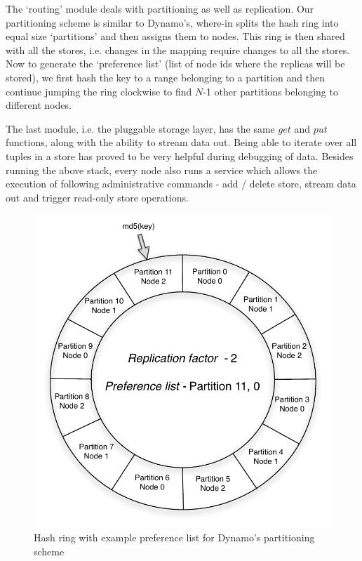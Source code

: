 The `routing' module deals with partitioning as well as replication. Our partitioning scheme is similar to Dynamo's, where-in \projectname{} splits the hash ring into equal size `partitions' and then assigns them to nodes. This ring is then shared with all the stores, i.e. changes in the mapping require changes to all the stores. Now to generate the `preference list' (list of node ids where the replicas will be stored), we first hash the key to a range belonging to a partition and then continue jumping the ring clockwise to find $N$-1 other partitions belonging to different nodes. 

The last module, i.e. the pluggable storage layer, has the same $get$ and $put$ functions, along with the ability to stream data out. Being able to iterate over all tuples in a store has proved to be very helpful during debugging of data. Besides running the above stack, every node also runs a service which allows the execution of following administrative commands - add / delete store, stream data out and trigger read-only store operations. 

\begin{figure}
  \centering
    \includegraphics[scale=0.40]{images/hash.pdf}
  \caption{Hash ring with example preference list for Dynamo's partitioning scheme }
  \label{hash}
\end{figure}

